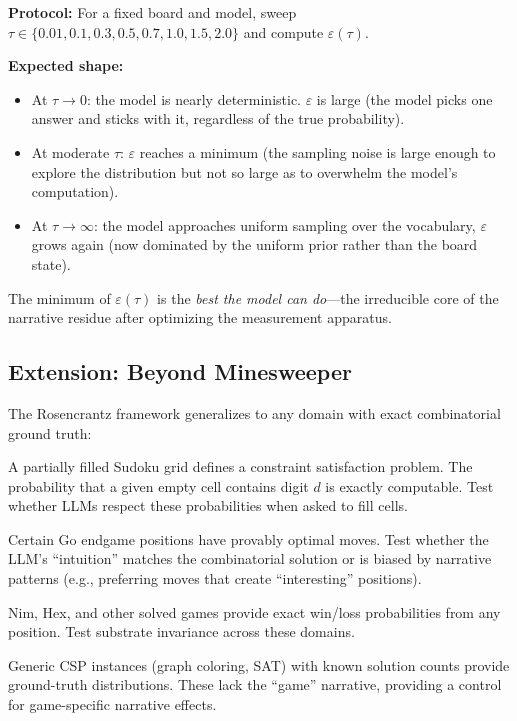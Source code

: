 \documentclass[12pt,a4paper]{article}
\theoremstyle{definition}
\theoremstyle{remark}
\begin{document}
\textbf{Protocol:}  For a fixed board and model, sweep
$\tau \in \{0.01, 0.1, 0.3, 0.5, 0.7, 1.0, 1.5, 2.0\}$ and
compute $\varepsilon(\tau)$.

\textbf{Expected shape:}
\begin{itemize}
  \item At $\tau \to 0$: the model is nearly deterministic.
    $\varepsilon$ is large (the model picks one answer and sticks
    with it, regardless of the true probability).
  \item At moderate $\tau$: $\varepsilon$ reaches a minimum
    (the sampling noise is large enough to explore the distribution
    but not so large as to overwhelm the model's computation).
  \item At $\tau \to \infty$: the model approaches uniform sampling
    over the vocabulary, $\varepsilon$ grows again (now dominated
    by the uniform prior rather than the board state).
\end{itemize}

The minimum of $\varepsilon(\tau)$ is the \emph{best the model can
do}---the irreducible core of the narrative residue after optimizing
the measurement apparatus.

\subsection{Extension: Beyond Minesweeper}
\label{sec:extension}

The Rosencrantz framework generalizes to any domain with exact
combinatorial ground truth:

\begin{description}[leftmargin=2em]
  \item[Sudoku.]  A partially filled Sudoku grid defines a constraint
    satisfaction problem.  The probability that a given empty cell
    contains digit $d$ is exactly computable.  Test whether LLMs
    respect these probabilities when asked to fill cells.

  \item[Go endgames.]  Certain Go endgame positions have provably
    optimal moves.  Test whether the LLM's ``intuition'' matches
    the combinatorial solution or is biased by narrative patterns
    (e.g., preferring moves that create ``interesting'' positions).

  \item[Combinatorial games.]  Nim, Hex, and other solved games
    provide exact win/loss probabilities from any position.  Test
    substrate invariance across these domains.

  \item[Constraint satisfaction.]  Generic CSP instances (graph
    coloring, SAT) with known solution counts provide ground-truth
    distributions.  These lack the ``game'' narrative, providing a
    control for game-specific narrative effects.
\end{description}
\end{document}
